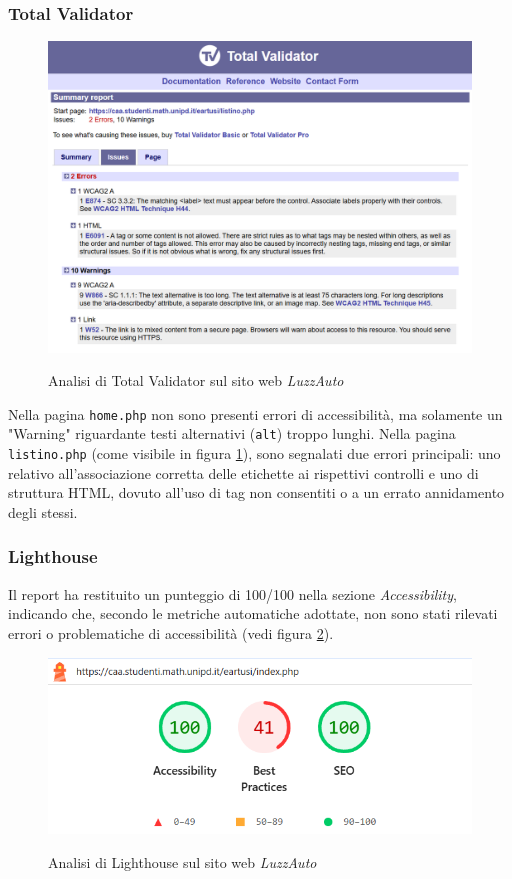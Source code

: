 \subsubsection{Total Validator}
\begin{figure}[H]
    \centering
    \includegraphics[width=0.8\linewidth, alt={Screenshot dell'analisi di Total Validator sul sito web LuzzAuto}]{img/TV_luzzauto.png}
    \caption{Analisi di Total Validator sul sito web \textit{LuzzAuto}}\label{fig:TV_luzzauto}
\end{figure}

\noindent Nella pagina \texttt{home.php} non sono presenti errori di accessibilità, ma solamente un "Warning" riguardante testi alternativi (\texttt{alt}) troppo lunghi. 
Nella pagina \texttt{listino.php} (come visibile in figura \ref{fig:TV_luzzauto}), sono segnalati due errori principali: 
uno relativo all'associazione corretta delle etichette ai rispettivi controlli e uno di struttura HTML, dovuto all'uso di tag non consentiti o a un errato annidamento degli stessi. 

\subsubsection{Lighthouse}
\noindent Il report ha restituito un punteggio di 100/100 nella sezione \textit{Accessibility}, indicando che, secondo le metriche automatiche adottate, non sono stati rilevati errori o problematiche di accessibilità (vedi figura \ref{fig:Lighthouse_luzzauto}).
\begin{figure}[H]
    \centering
    \includegraphics[width=0.6\linewidth, alt={Screenshot dell'analisi di Lighthouse sul sito web LuzzAuto}]{img/Lighthouse_luzzauto.png}
    \caption{Analisi di Lighthouse sul sito web \textit{LuzzAuto}}\label{fig:Lighthouse_luzzauto}
\end{figure}

